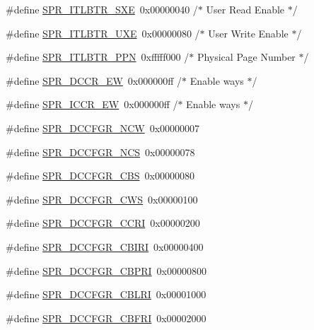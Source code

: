 \begin{DoxyCompactItemize}
\item 
\#define \hyperlink{spr-defs_8h_adc19f74a9084296d57e02ddd829c73bd}{\-S\-P\-R\-\_\-\-I\-T\-L\-B\-T\-R\-\_\-\-S\-X\-E}~0x00000040  /$\ast$ User Read Enable $\ast$/
\item 
\#define \hyperlink{spr-defs_8h_a39acb7ee93953621e137fcc5ec9c5956}{\-S\-P\-R\-\_\-\-I\-T\-L\-B\-T\-R\-\_\-\-U\-X\-E}~0x00000080  /$\ast$ User Write Enable $\ast$/
\item 
\#define \hyperlink{spr-defs_8h_ac192d4140b978a4da8bc30d97d703e6e}{\-S\-P\-R\-\_\-\-I\-T\-L\-B\-T\-R\-\_\-\-P\-P\-N}~0xfffff000  /$\ast$ Physical Page Number $\ast$/
\item 
\#define \hyperlink{spr-defs_8h_ae6a721b6ba1648e80709c999c8d7df6a}{\-S\-P\-R\-\_\-\-D\-C\-C\-R\-\_\-\-E\-W}~0x000000ff  /$\ast$ Enable ways $\ast$/
\item 
\#define \hyperlink{spr-defs_8h_a19f40ffe6e2d040fd59fae977861dceb}{\-S\-P\-R\-\_\-\-I\-C\-C\-R\-\_\-\-E\-W}~0x000000ff  /$\ast$ Enable ways $\ast$/
\item 
\#define \hyperlink{spr-defs_8h_a097cd64df09158b9c45d454f67762575}{\-S\-P\-R\-\_\-\-D\-C\-C\-F\-G\-R\-\_\-\-N\-C\-W}~0x00000007
\item 
\#define \hyperlink{spr-defs_8h_af770e5a5bd88bba0a7ee1321470c9de1}{\-S\-P\-R\-\_\-\-D\-C\-C\-F\-G\-R\-\_\-\-N\-C\-S}~0x00000078
\item 
\#define \hyperlink{spr-defs_8h_a4f4957495c90100b0e99d3e98a07ee20}{\-S\-P\-R\-\_\-\-D\-C\-C\-F\-G\-R\-\_\-\-C\-B\-S}~0x00000080
\item 
\#define \hyperlink{spr-defs_8h_a003a16d8be5b2707207fe35a2f429a8f}{\-S\-P\-R\-\_\-\-D\-C\-C\-F\-G\-R\-\_\-\-C\-W\-S}~0x00000100
\item 
\#define \hyperlink{spr-defs_8h_a69878e806c739d7e4f0a5b4566353d70}{\-S\-P\-R\-\_\-\-D\-C\-C\-F\-G\-R\-\_\-\-C\-C\-R\-I}~0x00000200
\item 
\#define \hyperlink{spr-defs_8h_ad9c293e6f7a204bb1f8e255f0cbb89e5}{\-S\-P\-R\-\_\-\-D\-C\-C\-F\-G\-R\-\_\-\-C\-B\-I\-R\-I}~0x00000400
\item 
\#define \hyperlink{spr-defs_8h_aafbb7e4fc7ae14de9019299ab95502ed}{\-S\-P\-R\-\_\-\-D\-C\-C\-F\-G\-R\-\_\-\-C\-B\-P\-R\-I}~0x00000800
\item 
\#define \hyperlink{spr-defs_8h_aa61d05354e7232412ed331e15635ffa7}{\-S\-P\-R\-\_\-\-D\-C\-C\-F\-G\-R\-\_\-\-C\-B\-L\-R\-I}~0x00001000
\item 
\#define \hyperlink{spr-defs_8h_a5c6e97f62f6fd777669eb94328434a8d}{\-S\-P\-R\-\_\-\-D\-C\-C\-F\-G\-R\-\_\-\-C\-B\-F\-R\-I}~0x00002000

\end{DoxyCompactItemize}
